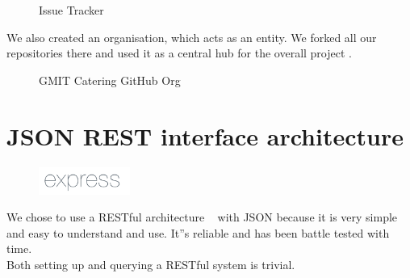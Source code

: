   \begin{figure}[H] 
  	\caption{Issue Tracker}
  	\label{fig:speciation}
  \end{figure}
  
  
  We also created an organisation, which acts as an entity.
  We forked all our repositories there and used it as a central hub for the overall project \cite{github_org}.
  \begin{figure}[H] 
  	\caption{GMIT Catering GitHub Org}
  	\label{fig:speciation}
  \end{figure}
  
  \section{JSON REST interface architecture}	%
  \begin{figure}
  	\includegraphics[width=3cm]{img/mobile-app/logos/express.png}
  \end{figure} 
We chose to use a RESTful architecture   ~\cite{JSON_REST_interface} with JSON   \cite{json} because it is very simple and easy to understand and use.
It''s reliable and has been battle tested with time.
\\
Both setting up and querying a RESTful system is trivial.

